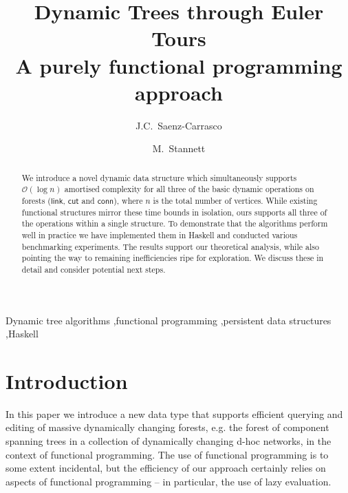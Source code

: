 \documentclass{elsarticle}
\newcommand{\MATHSF}[1]{\ensuremath{\mathsf{#1}}\xspace}
\newcommand{\link}{\MATHSF{link}}
\newcommand{\cut}{\MATHSF{cut}}
\newcommand{\conn}{\MATHSF{conn}}
\renewcommand{\O}{\ensuremath{\mathcal{O}}}
\begin{document}
\title{Dynamic Trees through Euler Tours\\%
\large{A purely functional programming approach}}

\author{J.C.~Saenz-Carrasco}

\author{M.~Stannett}

\address{Department of Computer Science,\\
Regent Court, 211 Portobello,\\
Sheffield S1 4DP, United Kingdom}


\begin{abstract}
We introduce a novel dynamic data structure which simultaneously supports $\O(\log n)$ amortised complexity for all three of the basic dynamic operations on forests (\link, \cut and \conn), where $n$ is the total number of vertices. While existing functional structures mirror these time bounds in isolation, ours supports all three of the operations within a single structure. To demonstrate that the algorithms perform well in practice we have implemented them in Haskell and conducted various benchmarking experiments. The results support our theoretical analysis, while also pointing the way to remaining inefficiencies ripe for exploration. We discuss these in detail and consider potential next steps.
\end{abstract}

\begin{keyword}
Dynamic tree algorithms \sep functional programming \sep persistent data structures \sep Haskell
\end{keyword}


\maketitle

% 


\section{Introduction}
\label{sec:Intro}


In this paper we introduce a new data type that supports efficient querying and editing of massive dynamically changing forests, e.g. the forest of component spanning trees in a collection of dynamically changing d-hoc networks, in the context of functional programming. The use of functional programming is to some extent incidental, but the efficiency of our approach certainly relies on aspects of functional programming -- in particular, the use of lazy evaluation.
\end{document}

